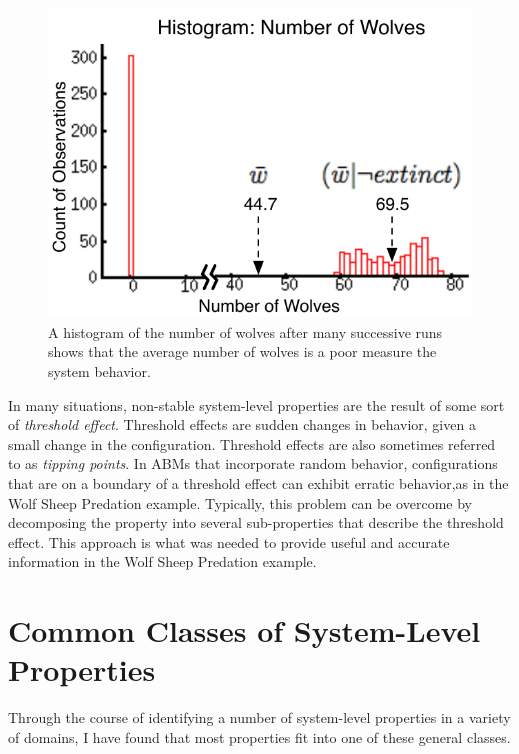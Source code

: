 \begin{figure}[ht]
\centering
\includegraphics{images/num_wolves.pdf}
\caption{A histogram of the number of wolves after many successive runs shows that the average number of wolves is a poor measure the system behavior.}
\label{fig:num_wolves}
\end{figure}


In many situations, non-stable system-level properties are the result of some sort of \textit{threshold effect}.
Threshold effects are sudden changes in behavior, given a small change in the configuration.
Threshold effects are also sometimes referred to as \textit{tipping points}.
In ABMs that incorporate random behavior, configurations that are on a boundary of a threshold effect can exhibit erratic behavior,as in the Wolf Sheep Predation example.
Typically, this problem can be overcome by decomposing the property into several sub-properties that describe the threshold effect. 
This approach is what was needed to provide useful and accurate information in the Wolf Sheep Predation example.

\section{Common Classes of System-Level Properties}

Through the course of identifying a number of system-level properties in a variety of domains, I have found that most properties fit into one of these general classes.


